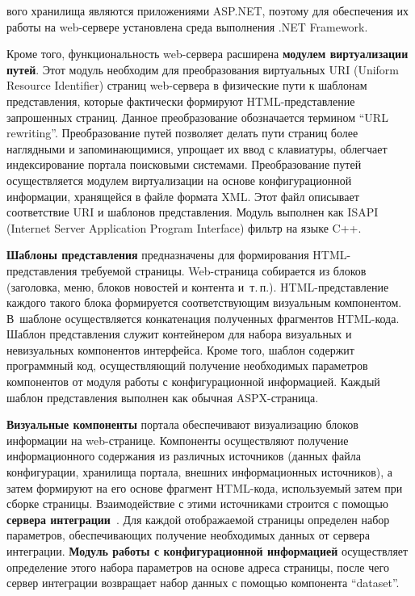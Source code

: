 \begin{multicols}{2}

\noindent
вого хранилища являются приложениями ASP.NET,
поэтому для обеспечения их работы на web-сервере установлена среда выполнения .NET
Framework.

Кроме того, функциональность web-сер\-ве\-ра расширена \textbf{модулем
виртуализации путей}. Этот модуль необходим для преобразования виртуальных URI
(Uniform Resource Identifier) страниц web-сер\-ве\-ра в физические пути к шаблонам
пред\-став\-ле\-ния, которые фактически формируют HTML-пред\-став\-ле\-ние запрошенных
страниц. Данное преобразование обозначается термином ``URL rewriting''.
Преобразование путей позволяет делать пути страниц более наглядными и
запоминающимися, упрощает их ввод с клавиатуры, облегчает индексирование портала
поисковыми системами. Преобразование путей осуществляется модулем виртуализации
на основе конфигурационной информации, хранящейся в файле формата XML. Этот файл
описывает соответствие URI и шаблонов представления. Модуль выполнен как ISAPI
(Internet Server Application Program Interface) фильтр на языке C++.

 \textbf{Шаблоны представления} предназначены для формирования
 HTML-пред\-став\-ле\-ния требуемой страницы. Web-стра\-ни\-ца собирается из блоков
(заголовка, меню, блоков новостей и контента и~т.\,п.). HTML-пред\-став\-ле\-ние каждого
такого блока формируется соответствующим визуальным ком\-по\-нен\-том. В~шаблоне
осуществляется конкатенация полу\-чен\-ных фрагментов HTML-кода. Шаблон %
представления служит контейнером для набора %
 визуальных и невизуальных компонентов
интерфейса. Кроме того, шаблон содержит программный код, осуществляющий
получение необходимых па\-ра\-мет\-ров компонентов от модуля работы с конфигурационной
информацией. Каждый шаблон пред\-став\-ле\-ния выполнен как обычная ASPX-стра\-ни\-ца.

 \textbf{Визуальные компоненты} портала обеспечивают визуализацию блоков
информации на web-стра\-ни\-це. Компоненты осуществляют получение информационного
содержания из различных источников (данных файла конфигурации, хранилища портала,
внешних информационных источников), а затем формируют на его основе фрагмент
HTML-кода, используемый затем при сборке страницы. Взаимодействие с этими
источниками строится с помощью \textbf{сервера интеграции}~\cite{7bos}. Для каждой
отображаемой страницы определен набор параметров, обеспечивающих получение
необходимых данных от сервера интеграции. \textbf{Модуль работы с конфигурационной
информацией} осуществляет определение этого набора параметров на основе адреса
страницы, после чего сервер интеграции возвращает набор данных с помощью
компонента ``dataset''.


\end{multicols}
